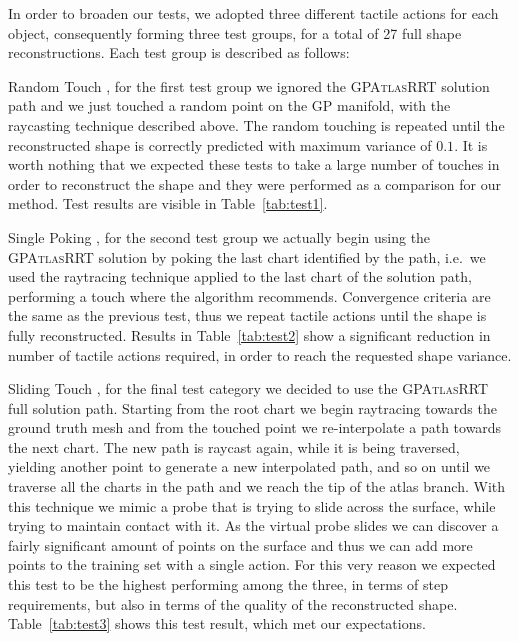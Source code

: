 In order to broaden our tests, we adopted three different tactile actions for each object, consequently forming 
three test groups, for a total of 27 full shape reconstructions. Each test group is described as follows:
\begin{asparadesc}
    \item[Random Touch], for the first test group we ignored the \textsc{GPAtlasRRT} solution path and 
        we just touched a random point on the GP manifold, with the raycasting technique described above.
        The random touching is repeated until the reconstructed shape is correctly predicted with
        maximum variance of $0.1$.
        It is worth nothing that we expected these tests to take a large number of touches
        in order to reconstruct the shape and they were performed as a comparison for our method.
        Test results are visible in Table~\ref{tab:test1}.
    \item[Single Poking], for the second test group we actually begin using the \textsc{GPAtlasRRT} solution by
        poking the last chart identified by the path, i.e.\ we used the raytracing technique applied to the last
        chart of the solution path, performing a touch where the algorithm recommends.
        Convergence criteria are the same as the previous test, thus we repeat tactile actions
        until the shape is fully reconstructed. Results in Table~\ref{tab:test2} show a significant reduction
        in number of tactile actions required, in order to reach the requested shape variance.
    \item[Sliding Touch],  for the  final test  category we  decided to use the
    \textsc{GPAtlasRRT}  full solution  path. Starting from the root chart we begin raytracing towards the ground truth mesh and from the touched point we
    re-interpolate a  path towards the next  chart. The new path  is raycast
    again, while it is being traversed, yielding another point to generate a new interpolated path, and so
    on until we traverse all the charts in the path and we reach the tip of the atlas branch.
    With this technique we mimic a probe that is trying to slide across the surface,
    while trying to maintain contact with it. As the virtual probe slides we can discover
    a fairly significant amount of points on the surface and thus we can add more points to the training set
    with a single action. For this very reason we expected this test to be the highest performing among the three,
    in terms of step requirements, but also in terms of the quality of the reconstructed shape.
    Table~\ref{tab:test3} shows this test result, which met our expectations.
\end{asparadesc}

